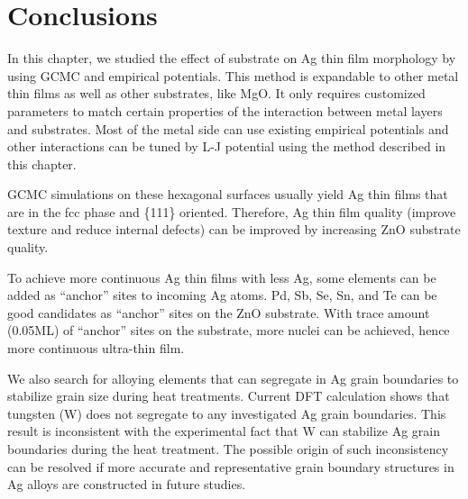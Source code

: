 \section{Conclusions}
In this chapter, we studied the effect of substrate on Ag thin film morphology by using \ac{GCMC} and empirical potentials. This method is expandable to other metal thin films as well as other substrates, like MgO. It only requires customized parameters to match certain properties of the interaction between metal layers and substrates. Most of the metal side can use existing empirical potentials and other interactions can be tuned by \ac{L-J} potential using the method described in this chapter.

\ac{GCMC} simulations on these hexagonal surfaces usually yield Ag thin films that are in the fcc phase and \{111\} oriented. Therefore, Ag thin film quality (improve texture and reduce internal defects) can be improved by increasing ZnO substrate quality.

To achieve more continuous Ag thin films with less Ag, some elements can be added as ``anchor'' sites to incoming Ag atoms. Pd, Sb, Se, Sn, and Te can be good candidates as ``anchor'' sites on the ZnO substrate. With trace amount (0.05\ac{ML}) of ``anchor'' sites on the substrate, more nuclei can be achieved, hence more continuous ultra-thin film.

We also search for alloying elements that can segregate in Ag grain boundaries to stabilize grain size during heat treatments. Current \ac{DFT} calculation shows that tungsten (W) does not segregate to any investigated Ag grain boundaries. This result is inconsistent with the experimental fact that W can stabilize Ag grain boundaries during the heat treatment. The possible origin of such inconsistency can be resolved if more accurate and representative grain boundary structures in Ag alloys are constructed in future studies.